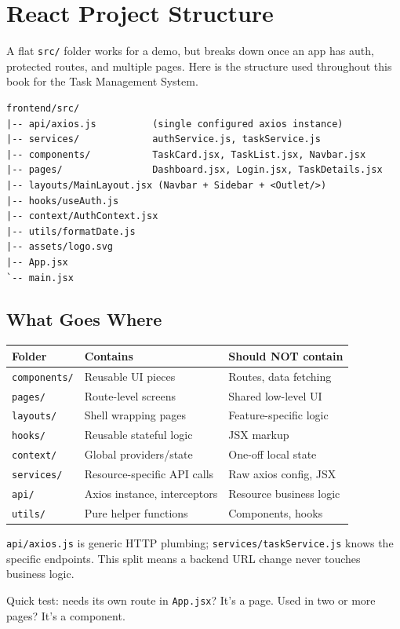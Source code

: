 \chapter{React Project Structure}

A flat \texttt{src/} folder works for a demo, but breaks down once an app has
auth, protected routes, and multiple pages. Here is the structure used
throughout this book for the Task Management System.

\begin{diagrambox}
\begin{verbatim}
frontend/src/
|-- api/axios.js          (single configured axios instance)
|-- services/             authService.js, taskService.js
|-- components/           TaskCard.jsx, TaskList.jsx, Navbar.jsx
|-- pages/                Dashboard.jsx, Login.jsx, TaskDetails.jsx
|-- layouts/MainLayout.jsx (Navbar + Sidebar + <Outlet/>)
|-- hooks/useAuth.js
|-- context/AuthContext.jsx
|-- utils/formatDate.js
|-- assets/logo.svg
|-- App.jsx
`-- main.jsx
\end{verbatim}
\end{diagrambox}

\section{What Goes Where}

\begin{table}[h]
\centering
\begin{tabularx}{\textwidth}{lXX}
\toprule
\textbf{Folder} & \textbf{Contains} & \textbf{Should NOT contain} \\
\midrule
\texttt{components/} & Reusable UI pieces & Routes, data fetching \\
\texttt{pages/} & Route-level screens & Shared low-level UI \\
\texttt{layouts/} & Shell wrapping pages & Feature-specific logic \\
\texttt{hooks/} & Reusable stateful logic & JSX markup \\
\texttt{context/} & Global providers/state & One-off local state \\
\texttt{services/} & Resource-specific API calls & Raw axios config, JSX \\
\texttt{api/} & Axios instance, interceptors & Resource business logic \\
\texttt{utils/} & Pure helper functions & Components, hooks \\
\bottomrule
\end{tabularx}
\end{table}

\begin{notebox}[NOTE]
\texttt{api/axios.js} is generic HTTP plumbing; \texttt{services/taskService.js}
knows the specific endpoints. This split means a backend URL change never
touches business logic.
\end{notebox}

\begin{tipbox}[TIP]
Quick test: needs its own route in \texttt{App.jsx}? It's a page. Used in two
or more pages? It's a component.
\end{tipbox}
